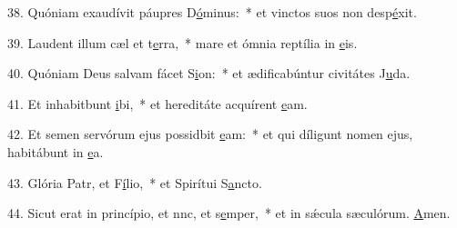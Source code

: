 38. Quóniam exaudívit páupres D\uline{ó}minus:~* et vinctos suos non desp\uline{é}xit.\par 
39. Laudent illum cæl et t\uline{e}rra,~* mare et ómnia reptília in \uline{e}is.\par 
40. Quóniam Deus salvam fácet S\uline{i}on:~* et ædificabúntur civitátes J\uline{u}da.\par 
41. Et inhabitbunt \uline{i}bi,~* et hereditáte acquírent \uline{e}am.\par 
42. Et semen servórum ejus possidbit \uline{e}am:~* et qui díligunt nomen ejus, habitábunt in \uline{e}a.\par 
43. Glória Patr, et F\uline{í}lio,~* et Spirítui S\uline{a}ncto.\par 
44. Sicut erat in princípio, et nnc, et s\uline{e}mper,~* et in sǽcula sæculórum. \uline{A}men.\par 
